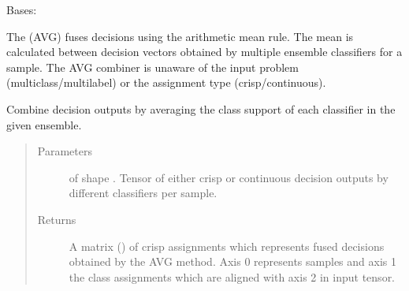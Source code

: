 \documentclass[letterpaper,10pt,english]{sphinxmanual}
\begin{document}
\begin{fulllineitems}
\label{\detokenize{pusion.core.simple_average_combiner:pusion.core.simple_average_combiner.SimpleAverageCombiner}}
\sphinxAtStartPar
Bases: {\hyperref[\detokenize{pusion.core.combiner:pusion.core.combiner.UtilityBasedCombiner}]{}}

\sphinxAtStartPar
The {\hyperref[\detokenize{pusion.core.simple_average_combiner:pusion.core.simple_average_combiner.SimpleAverageCombiner}]{}} (AVG) fuses decisions using the arithmetic mean rule.
The mean is calculated between decision vectors obtained by multiple ensemble classifiers for a sample.
The AVG combiner is unaware of the input problem (multiclass/multilabel) or the assignment type (crisp/continuous).

\begin{fulllineitems}
\label{\detokenize{pusion.core.simple_average_combiner:pusion.core.simple_average_combiner.SimpleAverageCombiner.combine}}
\sphinxAtStartPar
Combine decision outputs by averaging the class support of each classifier in the given ensemble.
\begin{quote}\begin{description}
\item[{Parameters}] \leavevmode
\sphinxAtStartPar
{} \textendash{}  of shape .
Tensor of either crisp or continuous decision outputs by different classifiers per sample.

\item[{Returns}] \leavevmode
\sphinxAtStartPar
A matrix () of crisp assignments which represents fused
decisions obtained by the AVG method. Axis 0 represents samples and axis 1 the class
assignments which are aligned with axis 2 in  input tensor.

\end{description}\end{quote}

\end{fulllineitems}


\end{fulllineitems}
\end{document}
